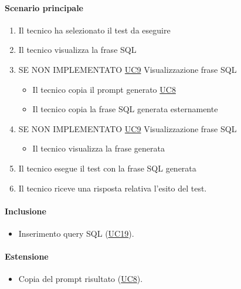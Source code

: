 \paragraph*{Scenario principale}
\begin{enumerate}
  \item Il tecnico ha selezionato il test da eseguire
  \item Il tecnico visualizza la frase SQL
  \item SE NON IMPLEMENTATO \hyperref[UC9]{UC9} Visualizzazione frase SQL
    \begin{itemize}
      \item Il tecnico copia il prompt generato \hyperref[UC8]{UC8}
      \item Il tecnico copia la frase SQL generata esternamente
    \end{itemize}
  \item SE NON IMPLEMENTATO \hyperref[UC9]{UC9} Visualizzazione frase SQL
    \begin{itemize}
      \item Il tecnico visualizza la frase generata
    \end{itemize}
  \item Il tecnico esegue il test con la frase SQL generata
  \item Il tecnico riceve una risposta relativa l’esito del test.
\end{enumerate}

\paragraph*{Inclusione}
\begin{itemize}
  \item Inserimento query SQL (\hyperref[UC19]{UC19}).
\end{itemize}

\paragraph*{Estensione}
\begin{itemize}
  \item Copia del prompt risultato (\hyperref[UC8]{UC8}).
\end{itemize}
